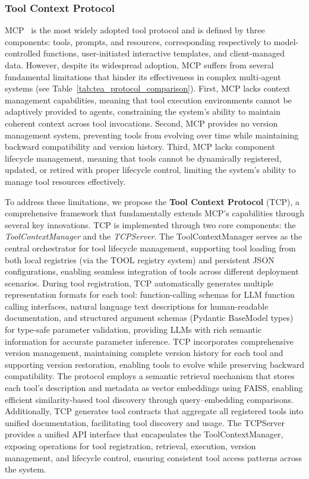 \documentclass[11pt]{article}
\begin{document}
\subsubsection{Tool Context Protocol}

MCP~\citep{anthropic2024mcp} is the most widely adopted tool protocol and is defined by three components: tools, prompts, and resources, corresponding respectively to model-controlled functions, user-initiated interactive templates, and client-managed data. However, despite its widespread adoption, MCP suffers from several fundamental limitations that hinder its effectiveness in complex multi-agent systems (see Table~\ref{tab:tea_protocol_comparison}). First, MCP lacks context management capabilities, meaning that tool execution environments cannot be adaptively provided to agents, constraining the system's ability to maintain coherent context across tool invocations. Second, MCP provides no version management system, preventing tools from evolving over time while maintaining backward compatibility and version history. Third, MCP lacks component lifecycle management, meaning that tools cannot be dynamically registered, updated, or retired with proper lifecycle control, limiting the system's ability to manage tool resources effectively.

To address these limitations, we propose the \textbf{Tool Context Protocol} (TCP), a comprehensive framework that fundamentally extends MCP's capabilities through several key innovations. TCP is implemented through two core components: the \textit{ToolContextManager} and the \textit{TCPServer}. The ToolContextManager serves as the central orchestrator for tool lifecycle management, supporting tool loading from both local registries (via the TOOL registry system) and persistent JSON configurations, enabling seamless integration of tools across different deployment scenarios. During tool registration, TCP automatically generates multiple representation formats for each tool: function-calling schemas for LLM function calling interfaces, natural language text descriptions for human-readable documentation, and structured argument schemas (Pydantic BaseModel types) for type-safe parameter validation, providing LLMs with rich semantic information for accurate parameter inference. TCP incorporates comprehensive version management, maintaining complete version history for each tool and supporting version restoration, enabling tools to evolve while preserving backward compatibility. The protocol employs a semantic retrieval mechanism that stores each tool's description and metadata as vector embeddings using FAISS, enabling efficient similarity-based tool discovery through query–embedding comparisons. Additionally, TCP generates tool contracts that aggregate all registered tools into unified documentation, facilitating tool discovery and usage. The TCPServer provides a unified API interface that encapsulates the ToolContextManager, exposing operations for tool registration, retrieval, execution, version management, and lifecycle control, ensuring consistent tool access patterns across the system.
\end{document}
